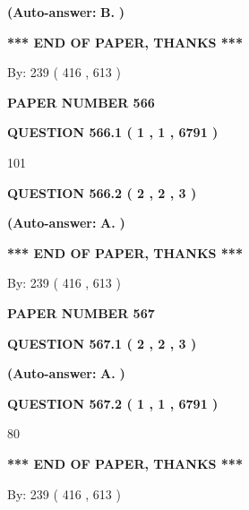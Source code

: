 \documentclass{ctexart}
\begin{document}
 
{\textbf{(Auto-answer:}}
{\textbf{\large{
B.}}}
{\textbf{)}}
 
 
   
   
   
   
\vspace{1.0in} 
{\textbf{\large{ *** END OF PAPER, THANKS *** }}} 
   
   
\hspace{1.0in} By: 
 239 ( 416 ,  613 )
   
   
   
   
\newpage 
\setcounter{page}{ 
   566001 } 
   
   
 {\textbf{ \Large{ PAPER NUMBER  566  }}}
   
   
   
   
  
  
{\textbf{\large{QUESTION
566.1 
 ( 1 , 1 , 6791 )
}}}

101
  
  
{\textbf{\large{QUESTION
566.2 
 ( 2 , 2 , 3 )
}}}
 
 
{\textbf{(Auto-answer:}}
{\textbf{\large{
A.}}}
{\textbf{)}}
 
 
   
   
   
   
\vspace{1.0in} 
{\textbf{\large{ *** END OF PAPER, THANKS *** }}} 
   
   
\hspace{1.0in} By: 
 239 ( 416 ,  613 )
   
   
   
   
\newpage 
\setcounter{page}{ 
   567001 } 
   
   
 {\textbf{ \Large{ PAPER NUMBER  567  }}}
   
   
   
   
  
  
{\textbf{\large{QUESTION
567.1 
 ( 2 , 2 , 3 )
}}}
 
 
{\textbf{(Auto-answer:}}
{\textbf{\large{
A.}}}
{\textbf{)}}
 
 
  
  
{\textbf{\large{QUESTION
567.2 
 ( 1 , 1 , 6791 )
}}}

80
   
   
   
   
\vspace{1.0in} 
{\textbf{\large{ *** END OF PAPER, THANKS *** }}} 
   
   
\hspace{1.0in} By: 
 239 ( 416 ,  613 )
   
   
   
\end{document}
